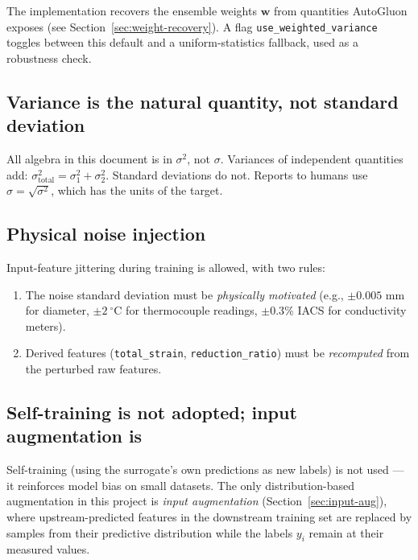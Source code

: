 \documentclass[11pt,a4paper]{article}
\begin{document}
The implementation recovers the ensemble weights $\bm w$ from quantities AutoGluon exposes (see Section~\ref{sec:weight-recovery}). A flag \texttt{use\_weighted\_variance} toggles between this default and a uniform-statistics fallback, used as a robustness check.

\subsection{Variance is the natural quantity, not standard deviation}

\begin{cautionbox}
All algebra in this document is in $\sigma^2$, not $\sigma$. Variances of independent quantities add: $\sigma^2_{\text{total}} = \sigma^2_1 + \sigma^2_2$. Standard deviations do not. Reports to humans use $\sigma = \sqrt{\sigma^2}$, which has the units of the target.
\end{cautionbox}

\subsection{Physical noise injection}

\begin{decisionbox}
Input-feature jittering during training is allowed, with two rules:
\begin{enumerate}
    \item The noise standard deviation must be \emph{physically motivated} (e.g., $\pm 0.005$ mm for diameter, $\pm 2~^\circ$C for thermocouple readings, $\pm 0.3$\% IACS for conductivity meters).
    \item Derived features (\texttt{total\_strain}, \texttt{reduction\_ratio}) must be \emph{recomputed} from the perturbed raw features.
\end{enumerate}
\end{decisionbox}

\subsection{Self-training is not adopted; input augmentation is}

Self-training (using the surrogate's own predictions as new labels) is not used --- it reinforces model bias on small datasets. The only distribution-based augmentation in this project is \emph{input augmentation} (Section~\ref{sec:input-aug}), where upstream-predicted features in the downstream training set are replaced by samples from their predictive distribution while the labels $y_i$ remain at their measured values.
\end{document}

